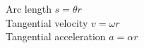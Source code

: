 \documentclass[12pt]{article}
\begin{document}
\begin{enumerate}
\bigskip
\bigskip
\bigskip

Arc length $s=\theta r$ \\
Tangential velocity $v=\omega r$ \\
Tangential acceleration $a=\alpha r$




 \end{enumerate}
 
\end{document}
